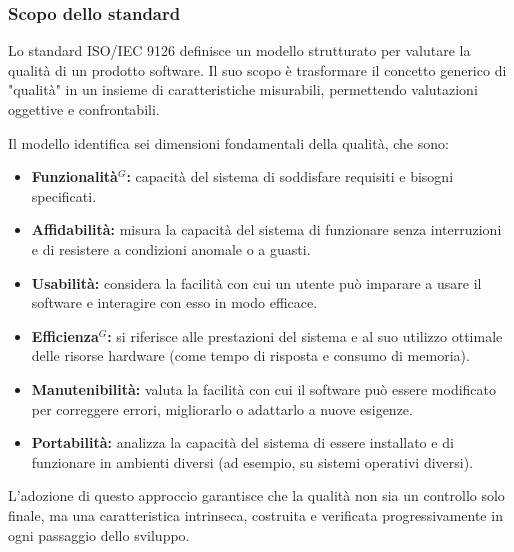 \subsubsection{Scopo dello standard}
Lo standard ISO/IEC 9126 definisce un modello strutturato per valutare la qualità di un prodotto software. Il suo scopo è trasformare il concetto generico di "qualità" in un insieme di caratteristiche misurabili, permettendo valutazioni oggettive e confrontabili.

Il modello identifica sei dimensioni fondamentali della qualità, che sono:
\begin{itemize}
    \setlength\itemsep{-0.1em}
    \item \textbf{Funzionalità$^G$:} capacità del sistema di soddisfare requisiti e bisogni specificati.
    \item \textbf{Affidabilità:} misura la capacità del sistema di funzionare senza interruzioni e di resistere a condizioni anomale o a guasti.
    \item \textbf{Usabilità:} considera la facilità con cui un utente può imparare a usare il software e interagire con esso in modo efficace.
    \item \textbf{Efficienza$^G$:} si riferisce alle prestazioni del sistema e al suo utilizzo ottimale delle risorse hardware (come tempo di risposta e consumo di memoria).
    \item \textbf{Manutenibilità:} valuta la facilità con cui il software può essere modificato per correggere errori, migliorarlo o adattarlo a nuove esigenze.
    \item \textbf{Portabilità:} analizza la capacità del sistema di essere installato e di funzionare in ambienti diversi (ad esempio, su sistemi operativi diversi).
\end{itemize}
L'adozione di questo approccio garantisce che la qualità non sia un controllo solo finale, ma una caratteristica intrinseca, costruita e verificata progressivamente in ogni passaggio dello sviluppo.

